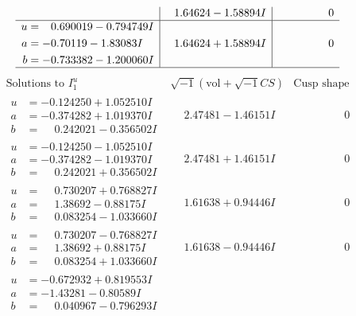\documentclass[1p]{elsarticle_modified}
\theoremstyle{definition}
\newcommand{\I}{\sqrt{-1}}
\begin{document}
$$\begin{array}{c|c|c}
 & \phantom{-}1.64624 - 1.58894 I & \phantom{-0.000000 } 0 \\ \hline\begin{aligned}
u &= \phantom{-}0.690019 - 0.794749 I \\
a &= -0.70119 - 1.83083 I \\
b &= -0.733382 - 1.200060 I\end{aligned}
 & \phantom{-}1.64624 + 1.58894 I & \phantom{-0.000000 } 0\\
 \hline 
 \end{array}$$\newpage$$\begin{array}{c|c|c}  
\text{Solutions to }I^u_{1}& \I (\text{vol} + \sqrt{-1}CS) & \text{Cusp shape}\\
 \hline 
\begin{aligned}
u &= -0.124250 + 1.052510 I \\
a &= -0.374282 + 1.019370 I \\
b &= \phantom{-}0.242021 - 0.356502 I\end{aligned}
 & \phantom{-}2.47481 - 1.46151 I & \phantom{-0.000000 } 0 \\ \hline\begin{aligned}
u &= -0.124250 - 1.052510 I \\
a &= -0.374282 - 1.019370 I \\
b &= \phantom{-}0.242021 + 0.356502 I\end{aligned}
 & \phantom{-}2.47481 + 1.46151 I & \phantom{-0.000000 } 0 \\ \hline\begin{aligned}
u &= \phantom{-}0.730207 + 0.768827 I \\
a &= \phantom{-}1.38692 - 0.88175 I \\
b &= \phantom{-}0.083254 - 1.033660 I\end{aligned}
 & \phantom{-}1.61638 + 0.94446 I & \phantom{-0.000000 } 0 \\ \hline\begin{aligned}
u &= \phantom{-}0.730207 - 0.768827 I \\
a &= \phantom{-}1.38692 + 0.88175 I \\
b &= \phantom{-}0.083254 + 1.033660 I\end{aligned}
 & \phantom{-}1.61638 - 0.94446 I & \phantom{-0.000000 } 0 \\ \hline\begin{aligned}
u &= -0.672932 + 0.819553 I \\
a &= -1.43281 - 0.80589 I \\
b &= \phantom{-}0.040967 - 0.796293 I\end{aligned}

\end{array}$$
\end{document}
